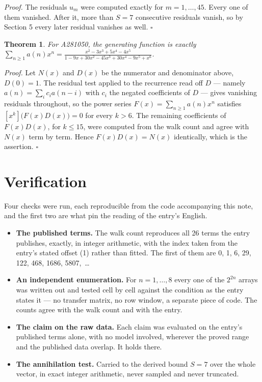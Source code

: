 \documentclass[11pt]{article}
\newtheorem{theorem}{Theorem}
\theoremstyle{definition}
\begin{document}
{\itshape Proof.} The residuals $u_m$ were computed exactly for $m = 1,\dots,45$. Every one of them vanished. After it, more than $S = 7$ consecutive residuals vanish, so by Section 5 every later residual vanishes as well. $\square$

\begin{theorem} For A281050, the generating function is exactly $\sum_{n\ge 1} a(n)x^n = \frac{x^{2} - 3x^{3} + 5x^{4} - 4x^{5}}{1 - 9x + 30x^{2} - 45x^{3} + 30x^{4} - 9x^{5} + x^{6}}$.\end{theorem}

{\itshape Proof.} Let $N(x)$ and $D(x)$ be the numerator and denominator above, $D(0)=1$. The residual test applied to the recurrence read off $D$ --- namely $a(n) = \sum_i c_i a(n-i)$ with $c_i$ the negated coefficients of $D$ --- gives vanishing residuals throughout, so the power series $F(x)=\sum_{n\ge 1}a(n)x^n$ satisfies $[x^k]\bigl(F(x)D(x)\bigr) = 0$ for every $k > 6$. The remaining coefficients of $F(x)D(x)$, for $k \le 15$, were computed from the walk count and agree with $N(x)$ term by term. Hence $F(x)D(x) = N(x)$ identically, which is the assertion. $\square$

\section{Verification}

Four checks were run, each reproducible from the code accompanying this note, and the first two are what pin the reading of the entry's English.

\begin{itemize}

\item {\bfseries The published terms.} The walk count reproduces all 26 terms the entry publishes, exactly, in integer arithmetic, with the index taken from the entry's stated offset (1) rather than fitted. The first of them are 0, 1, 6, 29, 122, 468, 1686, 5807,~\dots

\item {\bfseries An independent enumeration.} For $n = 1,\dots,8$ every one of the $2^{2n}$ arrays was written out and tested cell by cell against the condition as the entry states it --- no transfer matrix, no row window, a separate piece of code. The counts agree with the walk count and with the entry.

\item {\bfseries The claim on the raw data.} Each claim was evaluated on the entry's published terms alone, with no model involved, wherever the proved range and the published data overlap. It holds there.

\item {\bfseries The annihilation test.} Carried to the derived bound $S = 7$ over the whole vector, in exact integer arithmetic, never sampled and never truncated.

\end{itemize}
\end{document}
